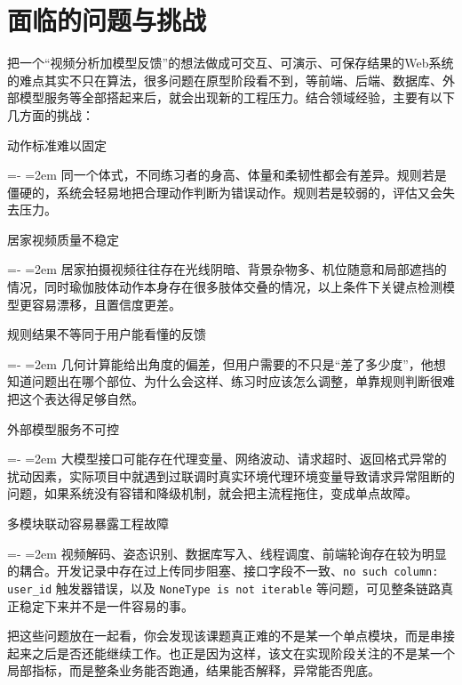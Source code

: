 \documentclass[UTF8,twoside]{ctexrep}
\makeatletter
\def@NAT@last@yr{\@citea}%
\def@NAT@last@yr{-\NAT@penalty}%
\newcommand{\researchitem}[2]{%
  \item #1%
  \par\begingroup
    \leftskip=-\leftmargin
    \rightskip=0pt
    \parindent=2em
    \noindent\hspace*{2em}\ignorespaces#2\unskip\par
  \endgroup
}
\makeatother
\begin{document}
\section{面临的问题与挑战}
把一个“视频分析加模型反馈”的想法做成可交互、可演示、可保存结果的Web系统的难点其实不只在算法，很多问题在原型阶段看不到，等前端、后端、数据库、外部模型服务等全部搭起来后，就会出现新的工程压力。结合领域经验，主要有以下几方面的挑战：
\begin{researchlist}
  
\researchitem{动作标准难以固定}{
    同一个体式，不同练习者的身高、体量和柔韧性都会有差异。规则若是僵硬的，系统会轻易地把合理动作判断为错误动作。规则若是较弱的，评估又会失去压力。
  }
  
\researchitem{居家视频质量不稳定}{
    居家拍摄视频往往存在光线阴暗、背景杂物多、机位随意和局部遮挡的情况，同时瑜伽肢体动作本身存在很多肢体交叠的情况，以上条件下关键点检测模型更容易漂移，且置信度更差。
  }
  
\researchitem{规则结果不等同于用户能看懂的反馈}{
    几何计算能给出角度的偏差，但用户需要的不只是“差了多少度”，他想知道问题出在哪个部位、为什么会这样、练习时应该怎么调整，单靠规则判断很难把这个表达得足够自然。
  }
  
\researchitem{外部模型服务不可控}{
    大模型接口可能存在代理变量、网络波动、请求超时、返回格式异常的扰动因素，实际项目中就遇到过联调时真实环境代理环境变量导致请求异常阻断的问题，如果系统没有容错和降级机制，就会把主流程拖住，变成单点故障。
  }
  
\researchitem{多模块联动容易暴露工程故障}{
    视频解码、姿态识别、数据库写入、线程调度、前端轮询存在较为明显的耦合。开发记录中存在过上传同步阻塞、接口字段不一致、\texttt{no such column: user\_id} 触发器错误，以及 \texttt{NoneType is not iterable} 等问题，可见整条链路真正稳定下来并不是一件容易的事。
  }
\end{researchlist}

把这些问题放在一起看，你会发现该课题真正难的不是某一个单点模块，而是串接起来之后是否还能继续工作。也正是因为这样，该文在实现阶段关注的不是某一个局部指标，而是整条业务能否跑通，结果能否解释，异常能否兜底。
\end{document}
